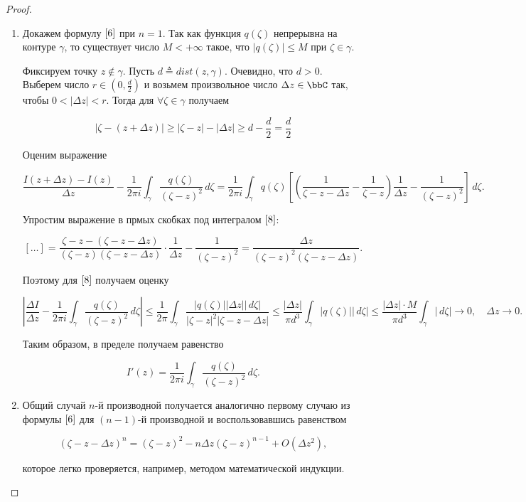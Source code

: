 \begin{proof}
\begin{enumerate}
\item 
Докажем формулу $\eqref{6}$ при $n = 1$. Так как функция $q(\zeta)$ непрерывна на контуре $\gamma$, то существует число $M < + \infty$ такое, что $|q(\zeta)| \le M$ при $\zeta \in \gamma$.

Фиксируем точку $z \notin \gamma$. Пусть $d \triangleq dist(z, \gamma)$. Очевидно, что $d > 0$. Выберем число $r \in (0, \frac{d}{2})$ и возьмем произвольное число $\Delta z \in \bbC$ так, чтобы $0 < |\Delta z| < r$. Тогда для $\forall \zeta \in \gamma$ получаем

\begin{equation} \label{7}
|\zeta - (z + \Delta z)| \ge |\zeta - z| - |\Delta z| \ge d - \frac{d}{2} = \frac{d}{2}
\end{equation}

Оценим выражение

\begin{equation} \label{8}
\frac{I(z + \Delta z) - I(z)}{\Delta z} - \frac{1}{2 \pi i} \int_\gamma \frac{q(\zeta)}{(\zeta - z)^2}\,d\zeta = \frac{1}{2 \pi i} \int_\gamma q(\zeta) \left[ \left( \frac{1}{\zeta - z - \Delta z} - \frac{1}{\zeta - z} \right) \frac{1}{\Delta z} - \frac{1}{(\zeta - z)^2} \right] \,d\zeta.
\end{equation}

Упростим выражение в прмых скобках под интегралом $\eqref{8}$:

$$
[\ldots] = \frac{\zeta - z - (\zeta - z - \Delta z)}{(\zeta - z)(\zeta - z - \Delta z)} \cdot \frac{1}{\Delta z} - \frac{1}{(\zeta - z)^2} = \frac{\Delta z}{(\zeta - z)^2 (\zeta - z - \Delta z)} .
$$

Поэтому для $\eqref{8}$ получаем оценку 

$$
\left| \frac{\Delta I}{\Delta z} - \frac{1}{2\pi i} \int_\gamma \frac{q(\zeta)}{(\zeta - z)^2}\,d\zeta \right| 
\le \frac{1}{2\pi} \int_\gamma \frac{|q(\zeta)||\Delta z||\,d\zeta|}{|\zeta - z|^2|\zeta - z - \Delta z|}
\le \frac{|\Delta z|}{\pi d^3} \int_\gamma |q(\zeta)||\,d\zeta| 
\le \frac{|\Delta z| \cdot M}{\pi d^3} \int_\gamma |\,d\zeta| \to 0, \quad \Delta z \to 0.
$$

Таким образом, в пределе получаем равенство

\begin{equation} \label{9}
I'(z) = \frac{1}{2\pi i} \int_\gamma \frac{q(\zeta)}{(\zeta - z)^2} \,d\zeta.
\end{equation}

\item 
Общий случай $n$-й производной получается аналогично первому случаю из формулы $\eqref{6}$ для $(n - 1)$-й производной и воспользовавшись равенством

$$
(\zeta - z - \Delta z)^n = (\zeta - z)^2 - n \Delta z (\zeta - z)^{n - 1} + O(\Delta z^2),
$$

которое легко проверяется, например, методом математической индукции.
\end{enumerate}
\end{proof}

